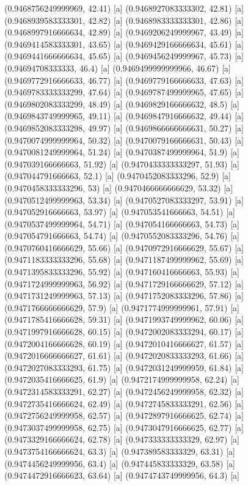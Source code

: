 {{{(0.9468756249999969, 42.41) [a] 
(0.9468927083333302, 42.81) [a] 
(0.9468939583333301, 42.82) [a] 
(0.9468983333333301, 42.86) [a] 
(0.9468997916666634, 42.89) [a] 
(0.9469206249999967, 43.49) [a] 
(0.9469414583333301, 43.65) [a] 
(0.9469429166666634, 45.61) [a] 
(0.9469441666666634, 45.65) [a] 
(0.9469456249999967, 45.73) [a] 
(0.94694708333333, 46.4) [a] 
(0.9469499999999966, 46.67) [a] 
(0.9469772916666633, 46.77) [a] 
(0.9469779166666633, 47.63) [a] 
(0.9469783333333299, 47.64) [a] 
(0.9469787499999965, 47.65) [a] 
(0.9469802083333299, 48.49) [a] 
(0.9469829166666632, 48.5) [a] 
(0.9469843749999965, 49.11) [a] 
(0.9469847916666632, 49.44) [a] 
(0.9469852083333298, 49.97) [a] 
(0.9469866666666631, 50.27) [a] 
(0.9470074999999964, 50.32) [a] 
(0.9470079166666631, 50.43) [a] 
(0.9470081249999964, 51.24) [a] 
(0.9470387499999964, 51.9) [a] 
(0.947039166666663, 51.92) [a] 
(0.9470433333333297, 51.93) [a] 
(0.947044791666663, 52.1) [a] 
(0.9470452083333296, 52.9) [a] 
(0.9470458333333296, 53) [a] 
(0.9470466666666629, 53.32) [a] 
(0.9470512499999963, 53.34) [a] 
(0.9470527083333297, 53.91) [a] 
(0.947052916666663, 53.97) [a] 
(0.947053541666663, 54.51) [a] 
(0.9470537499999964, 54.71) [a] 
(0.947054166666663, 54.73) [a] 
(0.947054791666663, 54.74) [a] 
(0.9470552083333296, 54.76) [a] 
(0.9470760416666629, 55.66) [a] 
(0.9470972916666629, 55.67) [a] 
(0.9471183333333296, 55.68) [a] 
(0.9471187499999962, 55.69) [a] 
(0.9471395833333296, 55.92) [a] 
(0.947160416666663, 55.93) [a] 
(0.9471724999999963, 56.92) [a] 
(0.9471729166666629, 57.12) [a] 
(0.9471731249999963, 57.13) [a] 
(0.9471752083333296, 57.86) [a] 
(0.9471766666666629, 57.9) [a] 
(0.9471774999999961, 57.91) [a] 
(0.9471785416666628, 59.31) [a] 
(0.9471993749999962, 60.06) [a] 
(0.9471997916666628, 60.15) [a] 
(0.9472002083333294, 60.17) [a] 
(0.9472004166666628, 60.19) [a] 
(0.9472010416666627, 61.57) [a] 
(0.9472016666666627, 61.61) [a] 
(0.9472020833333293, 61.66) [a] 
(0.9472027083333293, 61.75) [a] 
(0.9472031249999959, 61.84) [a] 
(0.9472035416666625, 61.9) [a] 
(0.9472174999999958, 62.24) [a] 
(0.9472314583333291, 62.27) [a] 
(0.9472456249999958, 62.32) [a] 
(0.9472735416666624, 62.49) [a] 
(0.9472745833333291, 62.56) [a] 
(0.9472756249999958, 62.57) [a] 
(0.9472897916666625, 62.74) [a] 
(0.9473037499999958, 62.75) [a] 
(0.9473047916666625, 62.77) [a] 
(0.9473329166666624, 62.78) [a] 
(0.947333333333329, 62.97) [a] 
(0.9473754166666624, 63.3) [a] 
(0.947389583333329, 63.31) [a] 
(0.9474456249999956, 63.4) [a] 
(0.947445833333329, 63.58) [a] 
(0.9474472916666623, 63.64) [a] 
(0.9474743749999956, 64.3) [a] 
}}}
